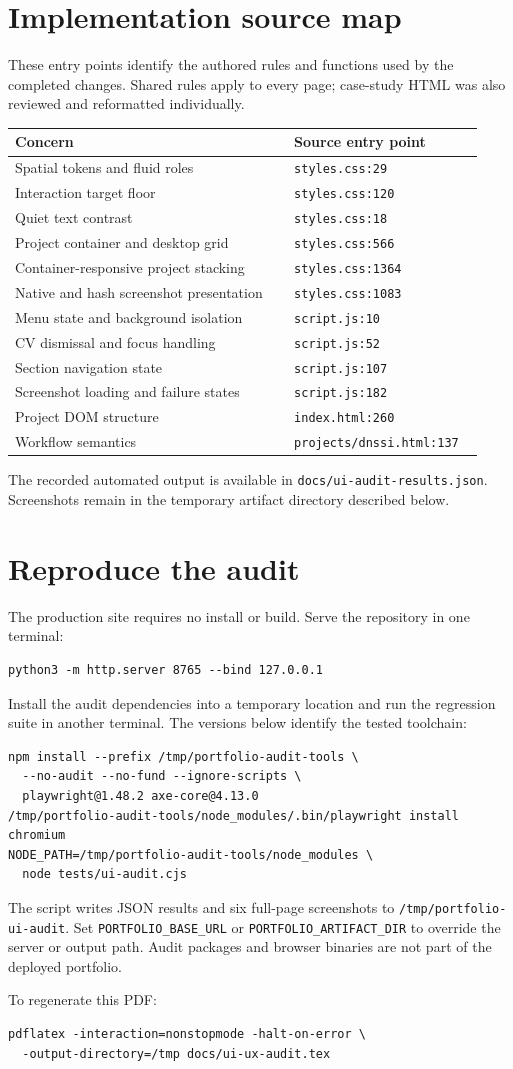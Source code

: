 \documentclass[11pt,a4paper]{article}
\newcommand{\file}[1]{\nolinkurl{#1}}
\begin{document}
\section{Implementation source map}
These entry points identify the authored rules and functions used by the completed changes. Shared rules apply to every page; case-study HTML was also reviewed and reformatted individually.
\begin{longtable}{p{0.56\linewidth}p{0.37\linewidth}}
\toprule
Concern & Source entry point \\
\midrule
\endhead
Spatial tokens and fluid roles & \file{styles.css:29} \\
Interaction target floor & \file{styles.css:120} \\
Quiet text contrast & \file{styles.css:18} \\
Project container and desktop grid & \file{styles.css:566} \\
Container-responsive project stacking & \file{styles.css:1364} \\
Native and hash screenshot presentation & \file{styles.css:1083} \\
Menu state and background isolation & \file{script.js:10} \\
CV dismissal and focus handling & \file{script.js:52} \\
Section navigation state & \file{script.js:107} \\
Screenshot loading and failure states & \file{script.js:182} \\
Project DOM structure & \file{index.html:260} \\
Workflow semantics & \file{projects/dnssi.html:137} \\
\bottomrule
\end{longtable}
The recorded automated output is available in \file{docs/ui-audit-results.json}. Screenshots remain in the temporary artifact directory described below.

\section{Reproduce the audit}
The production site requires no install or build. Serve the repository in one terminal:
\begin{lstlisting}
python3 -m http.server 8765 --bind 127.0.0.1
\end{lstlisting}
Install the audit dependencies into a temporary location and run the regression suite in another terminal. The versions below identify the tested toolchain:
\begin{lstlisting}
npm install --prefix /tmp/portfolio-audit-tools \
  --no-audit --no-fund --ignore-scripts \
  playwright@1.48.2 axe-core@4.13.0
/tmp/portfolio-audit-tools/node_modules/.bin/playwright install chromium
NODE_PATH=/tmp/portfolio-audit-tools/node_modules \
  node tests/ui-audit.cjs
\end{lstlisting}
The script writes JSON results and six full-page screenshots to \file{/tmp/portfolio-ui-audit}. Set \file{PORTFOLIO_BASE_URL} or \file{PORTFOLIO_ARTIFACT_DIR} to override the server or output path. Audit packages and browser binaries are not part of the deployed portfolio.

To regenerate this PDF:
\begin{lstlisting}
pdflatex -interaction=nonstopmode -halt-on-error \
  -output-directory=/tmp docs/ui-ux-audit.tex
\end{lstlisting}
\end{document}
